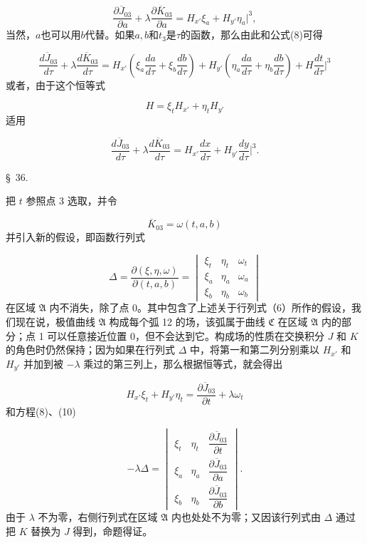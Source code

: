 \documentclass[11pt,a4paper,leqno]{article}
\begin{document}
\begin{equation}\tag{10}
\frac{\partial\overline{J}_{03}}{\partial a}+\lambda\frac{\partial\overline{K}_{03}}{\partial a}
=H_{x'}\xi_a+H_{y'}\eta_a\bigg|^3,
\end{equation}
当然，$a$也可以用$b$代替。如果$a,b$和$t_3$是$\tau$的函数，那么由此和公式(8)可得

\[
\frac{d\overline{J}_{03}}{d\tau}+\lambda\frac{d\overline{K}_{03}}{d\tau}
=H_{x'}\left(\xi_a\frac{da}{d\tau}+\xi_b\frac{db}{d\tau}\right)
+H_{y'}\left(\eta_a\frac{da}{d\tau}+\eta_b\frac{db}{d\tau}\right)+H\frac{dt}{d\tau}\bigg|^3
\]
或者，由于这个恒等式

\[
H=\xi_tH_{x'}+\eta_tH_{y'}
\]
适用

\begin{equation}\tag{11}
\frac{d\overline{J}_{03}}{d\tau}+\lambda\frac{d\overline{K}_{03}}{d\tau}
=H_{x'}\frac{dx}{d\tau}+H_{y'}\frac{dy}{d\tau}\bigg|^3.
\end{equation}
\begin{center}{\large \S~36.}\end{center}
把 $t$ 参照点 3 选取，并令

\[
\overline{K}_{03}=\omega(t,a,b)
\]
并引入新的假设，即函数行列式

\begingroup
\setlength{\arraycolsep}{1pt}
\[
\Delta=\frac{\partial(\xi,\eta,\omega)}{\partial(t,a,b)}=
\begin{vmatrix}
\xi_t&\eta_t&\omega_t\\
\xi_a&\eta_a&\omega_a\\
\xi_b&\eta_b&\omega_b
\end{vmatrix}
\]
在区域 $\mathfrak{A}$ 内不消失，除了点 0。其中包含了上述关于行列式（6）所作的假设，我们现在说，极值曲线 $\mathfrak{A}$ 构成每个弧 12 的场，该弧属于曲线 $\mathfrak{C}$ 在区域 $\mathfrak{A}$ 内的部分；点 1 可以任意接近位置 0，但不会达到它。构成场的性质在交换积分 $J$ 和 $K$ 的角色时仍然保持；因为如果在行列式 $\Delta$ 中，将第一和第二列分别乘以 $H_{x'}$ 和 $H_{y'}$ 并加到被 $-\lambda$ 乘过的第三列上，那么根据恒等式，就会得出

\[
H_{x'}\xi_t+H_{y'}\eta_t=\frac{\partial\overline{J}_{03}}{\partial t}+\lambda\omega_t
\]
和方程(8)、(10)

\[
-\lambda\Delta=
\begin{vmatrix}
\xi_t&\eta_t&\dfrac{\partial\overline{J}_{03}}{\partial t}\\[1.2ex]
\xi_a&\eta_a&\dfrac{\partial\overline{J}_{03}}{\partial a}\\[1.2ex]
\xi_b&\eta_b&\dfrac{\partial\overline{J}_{03}}{\partial b}
\end{vmatrix}.
\]
\endgroup
由于 $\lambda$ 不为零，右侧行列式在区域 $\mathfrak{A}$ 内也处处不为零；又因该行列式由 $\Delta$ 通过把 $K$ 替换为 $J$ 得到，命题得证。
\end{document}
